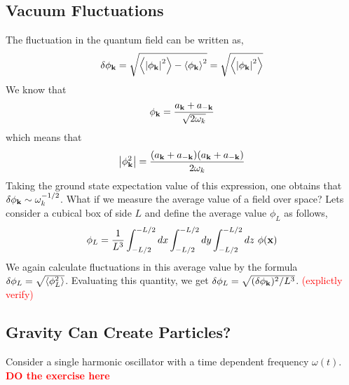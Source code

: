 \documentclass[a4paper,11pt]{article}
\begin{document}
\subsection{Vacuum Fluctuations}
The fluctuation in the quantum field can be written as,
$$\delta \phi_{\vb{k}} = \sqrt{\expval{\abs{\phi_{\vb{k}}}^2} - \expval{\phi_{\vb{k}}}^2} = \sqrt{\expval{\abs{\phi_{\vb{k}}}^2}}$$
We know that $$\phi_{\vb{k}} = \frac{a_{\vb{k}} + a_{-\vb{k}}}{\sqrt{2\omega_k}}$$ which means that 
$$\abs{\phi_{\vb{k}}^2} = \frac{(a_{\vb{k}} + a_{-\vb{k}})(a_{\vb{k}} + a_{-\vb{k}})}{{2\omega_k}}$$
Taking the ground state expectation value of this expression, one obtains that $\delta \phi_{\vb{k}} \sim \omega_k^{-1/2}$. What if we measure the average value of a field over space? Lets consider a cubical box of side $L$  and define the average value $\phi_L$ as follows,
$$\phi_L = \frac{1}{L^3} \int_{-L/2}^{-L/2}dx \int_{-L/2}^{-L/2}dy \int_{-L/2}^{-L/2}dz \ \phi(\vb{x})$$
We again calculate fluctuations in this average value by the formula $\delta \phi_L = \sqrt{\expval{\phi_L^2}}$. Evaluating this quantity, we get $\delta \phi_L = \sqrt{(\delta \phi_{\vb{k}})^2/L^3}$. \textcolor{red}{(explictly verify)}

\subsection{Gravity Can Create Particles?}
Consider a single harmonic oscillator with a time dependent frequency $\omega(t)$. \textbf{\textcolor{red}{DO the exercise here}}
\end{document}
